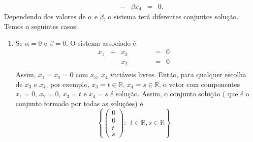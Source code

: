 \documentclass[11pt]{exam}
\begin{document}
\begin{questions}
\begin{solution}
$$\begin{matrix}
          & &   & &              &-&\beta x_4&=&0.
       \end{matrix}
       $$
       Dependendo dos valores de $\alpha$ e $\beta$, o sistema terá diferentes conjuntos solução. Temos o seguintes casos:
        \begin{enumerate}
        \item  Se $\alpha=0$ e $\beta=0$. O sistema associado é 
            $$
       \begin{matrix}
       x_1&+&x_2& &              & &             &=&0\\
          & &x_2& & & & &=&0\\
       \end{matrix}
       $$
       Assim, $x_1=x_2=0$ com $x_3$, $x_4$ variáveis livres. Então, para qualquer escolha de $x_3$ e $x_4$, por exemplo, $x_3=t \in \mathbb{R}$, $x_4=s \in \mathbb{R}$, o vetor 
       com componentes $x_1=0$, $x_2=0$, $x_3=t$ e $x_4=s$ é solução.
       Assim, o conjunto solução ( que é o conjunto formado por todas as soluções) é 
       $$ 
       \left\{
          \begin{pmatrix}
         0 \\
         0 \\
         t \\
         s
         \end{pmatrix}
         : \ \ t \in \mathbb{R}, s \in \mathbb{R}
       \right\}
       $$              
            

\end{enumerate}
\end{solution}
\end{questions}
\end{document}
